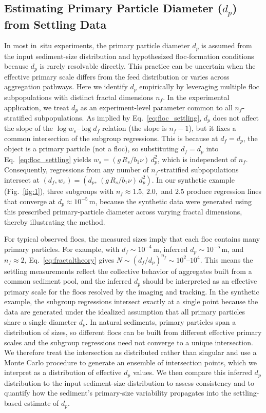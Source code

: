 \documentclass{agujournal2019}
\providecommand{\DIFadd}[1]{{\protect\color{blue}#1}}
\begin{document}
\subsection{Estimating Primary Particle Diameter ($d_p$) from Settling Data}

In most in~situ experiments, the primary particle diameter \(d_p\) is assumed from the input sediment-size distribution and hypothesized floc-formation conditions because \(d_p\) is rarely resolvable directly. \DIFadd{This practice can be uncertain when the effective primary scale differs from the feed distribution or varies across aggregation pathways.} Here we identify \(d_p\) empirically by leveraging multiple floc subpopulations with distinct fractal dimensions \(n_f\). \DIFadd{In the experimental application, we treat $d_p$ as an experiment-level parameter common to all $n_f$-stratified subpopulations.} As implied by Eq.~\eqref{eq:floc_settling}, \(d_p\) does not affect the slope of the \(\log w_s\)–\(\log d_f\) relation (the slope is \(n_f-1\)), but it fixes a common intersection of the subgroup regressions. This is because at \(d_f=d_p\), the object is a primary particle (not a floc), so substituting \(d_f=d_p\) into Eq.~\eqref{eq:floc_settling} yields \(w_s=(g\,R_s/b_1\nu)\,d_p^{2}\), which is independent of \(n_f\). Consequently, regressions from any number of \(n_f\)-stratified subpopulations intersect at \((d_f, w_s)=(d_p,\,(g\,R_s/b_1\nu)\,d_p^{2})\). In our synthetic example (Fig.~\ref{fig:1}), three subgroups with \(n_f \approx 1.5,\,2.0,\) and \(2.5\) produce regression lines that converge at \(d_p \approx 10^{-5}\,\mathrm{m}\), because the synthetic data were generated using this prescribed primary-particle diameter across varying fractal dimensions, thereby illustrating the method. 

\DIFadd{For typical observed flocs, the measured sizes imply that each floc contains many primary particles. For example, with $d_f \sim 10^{-4}\,\mathrm{m}$, inferred $d_p \sim 10^{-5}\,\mathrm{m}$, and $n_f \approx 2$, Eq.~\eqref{eq:fractaltheory} gives $N \sim (d_f/d_p)^{n_f} \sim 10^{2}$--$10^{4}$. This means the settling measurements reflect the collective behavior of aggregates built from a common sediment pool, and the inferred $d_p$ should be interpreted as an effective primary scale for the flocs resolved by the imaging and tracking. In the synthetic example, the subgroup regressions intersect exactly at a single point because the data are generated under the idealized assumption that all primary particles share a single diameter $d_p$. In natural sediments, primary particles span a distribution of sizes, so different flocs can be built from different effective primary scales and the subgroup regressions need not converge to a unique intersection. We therefore treat the intersection as distributed rather than singular and use a Monte Carlo procedure to generate an ensemble of intersection points, which we interpret as a distribution of effective $d_p$ values. We then compare this inferred $d_p$ distribution to the input sediment-size distribution to assess consistency and to quantify how the sediment’s primary-size variability propagates into the settling-based estimate of $d_p$.}
\end{document}
